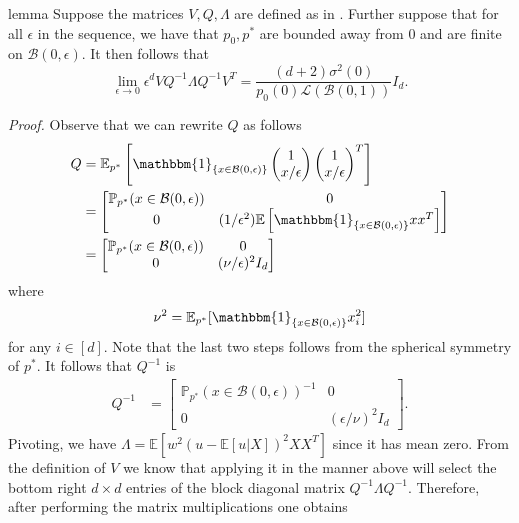 \documentclass[11pt]{article}
\begin{document}
\begin{restatable}{lemma}{} \label{lemma: asymptotic var bound}
    Suppose the matrices $V, Q, \Lambda$ are defined as in . Further suppose that for all $\epsilon$ in the sequence, we have that $p_0, p^*$ are bounded away from $0$ and are finite on $\mathcal{B}(0, \epsilon)$. It then follows that
    \[ \lim_{\epsilon \rightarrow 0}\epsilon^dVQ^{-1}\Lambda Q^{-1}V^T = \frac{(d+2)\sigma^2(0)}{p_0(0)\mathcal{L}(\mathcal{B}(0,1))}I_d.\]
\end{restatable}
\noindent \textit{Proof.} Observe that we can rewrite $Q$ as follows
\begin{align*}
    Q &= \mathbb{E}_{p^*}\left[\mathbbm{1}_{\{x \in \mathcal{B}(0, \epsilon)\}}\begin{pmatrix}
        1 \\ x/\epsilon
    \end{pmatrix}\begin{pmatrix}
        1 \\ x/\epsilon
    \end{pmatrix}^T\right] \\
    &= \begin{bmatrix}
         \mathbb{P}_{p^*}(x \in \mathcal{B}(0, \epsilon)) & 0 \\
         0 & (1/\epsilon^2)\mathbb{E}\left[\mathbbm{1}_{\{x \in \mathcal{B}(0, \epsilon)\}}xx^T\right]
    \end{bmatrix} \\
    &= \begin{bmatrix}
         \mathbb{P}_{p^*}(x \in \mathcal{B}(0, \epsilon)) & 0 \\
         0 & (\nu/\epsilon)^2I_d
    \end{bmatrix}
\end{align*}
where
\begin{equation*}
\nu^2 = \mathbb{E}_{p^*}[\mathbbm{1}_{\{x \in \mathcal{B}(0, \epsilon)\}}x_i^2]
\end{equation*}
for any $i \in [d]$. Note that the last two steps follows from the spherical symmetry of $p^*$. It follows that $Q^{-1}$ is
\begin{align} \label{eq: Q closed form}
    Q^{-1} &= \begin{bmatrix}
         \mathbb{P}_{p^*}(x \in \mathcal{B}(0, \epsilon))^{-1} & 0 \\
         0 & (\epsilon/\nu)^{2}I_d
    \end{bmatrix}.
\end{align}
Pivoting, we have $\Lambda = \mathbb{E}[w^2(u - \mathbb{E}[u|X])^2XX^T]$ since it has mean zero. From the definition of $V$ we know that applying it in the manner above will select the bottom right $d\times d$ entries of the block diagonal matrix $Q^{-1}\Lambda Q^{-1}$. Therefore, after performing the matrix multiplications one obtains
\end{document}
